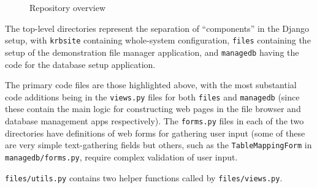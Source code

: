 \documentclass[12pt]{report}
\begin{document}
\begin{figure}[h]
  \begin{multicols}{2}
    \columnbreak
  \end{multicols}
  \caption{Repository overview}
  \label{fig:repository_overview}
\end{figure}

The top-level directories represent the separation of ``components'' in the Django setup, with \texttt{krbsite} containing whole-system configuration, \texttt{files} containing the setup of the demonstration file manager application, and \texttt{managedb} having the code for the database setup application.

The primary code files are those highlighted above, with the most substantial code additions being in the \texttt{views.py} files for both \texttt{files} and \texttt{managedb} (since these contain the main logic for constructing web pages in the file browser and database management apps respectively). The \texttt{forms.py} files in each of the two directories have definitions of web forms for gathering user input (some of these are very simple text-gathering fields but others, such as the \texttt{TableMappingForm} in \texttt{managedb/forms.py}, require complex validation of user input.

\texttt{files/utils.py} contains two helper functions called by \texttt{files/views.py}.
\end{document}

